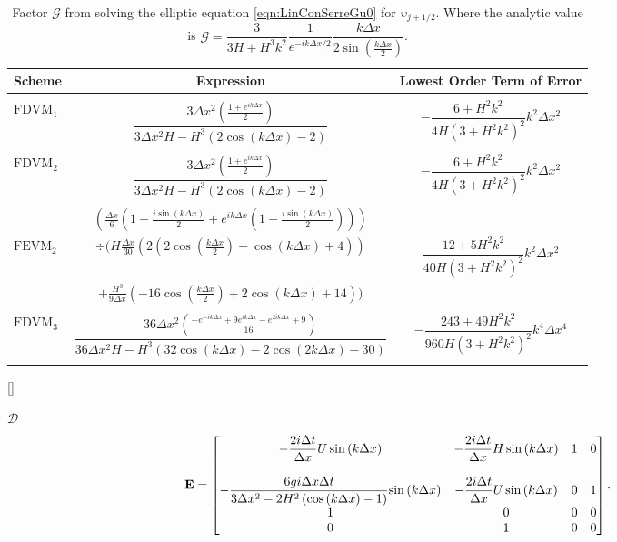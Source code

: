\begin{table}
	\centering   
	\begin{tabular}{l  c  c}
		Scheme& Expression& Lowest Order Term of Error\\
		\hline && \\
		$\text{FDVM}_1$& $\dfrac{3 \Delta x^2 \left(\frac{1 + e^{ik\Delta x}}{2}\right)}{3 \Delta x^2 H - H^3 \left(2\cos\left(k\Delta x\right) - 2\right)}$ & $-\dfrac{6 +H^2k^2}{4H \left(3 + H^2k^2\right)^2}k^2 \Delta x^2$ \\ & & \\
		$\text{FDVM}_2$& $\dfrac{3 \Delta x^2 \left(\frac{1 + e^{ik\Delta x}}{2}\right)}{3 \Delta x^2 H - H^3 \left(2\cos\left(k\Delta x\right) - 2\right)}$ & $-\dfrac{6 +H^2k^2}{4H \left(3 + H^2k^2\right)^2}k^2 \Delta x^2$ \\ & & \\
		& $\left(\frac{\Delta x}{6} \left(1 + \frac{i \sin\left(k \Delta x\right)}{2} + e^{ik\Delta x}\left(1 - \frac{i \sin\left(k \Delta x\right)}{2}\right) \right)\right)$ & \\  $\text{FEVM}_2$ & $\div  \Bigg(H\frac{\Delta x}{30} \left( 2\left(2\cos\left(\frac{k \Delta x}{2}\right) - \cos\left({k \Delta x}\right) + 4\right)  \right)$  & $\dfrac{12 + 5H^2k^2}{40H \left(3 + H^2k^2\right)^2}k^2 \Delta x^2$ \\ &$+ \frac{H^3 }{9\Delta x}\left(-16\cos\left(\frac{k\Delta x}{2}\right) + 2 \cos\left(k \Delta x\right) + 14\right)    \Bigg)$ & \\ & & \\
		$\text{FDVM}_3$&  $\dfrac{36 \Delta x^2 \left(\frac{-e^{-ik\Delta x} + 9e^{ik\Delta x} - e^{2ik\Delta x} + 9}{16}\right)}{36 \Delta x^2H - H^3\left(32\cos\left(k \Delta x\right) -2\cos\left(2k \Delta x\right) - 30\right)}$ & $-\dfrac{243 + 49H^2k^2}{960H\left(3 + H^2k^2\right)^2}k^4 \Delta x^4$ \\ & & \\ 
	\end{tabular}
	\caption{Factor $\mathcal{G}$ from solving the elliptic equation \eqref{eqn:LinConSerreGu0} for $\upsilon_{j+1/2}$. Where the analytic value is  $\mathcal{G} = \dfrac{3}{3H + H^3k^2} \dfrac{1}{e^{-ik\Delta x/2}} \dfrac{k\Delta x}{2 \sin\left(\frac{k \Delta x}{2}\right)}$.}
	\label{tab:Gfactor} 
\end{table}

[]

$\mathcal{D}$
\begin{equation*}
\mathbf{E} = \begin{bmatrix}
-  \dfrac{2 i\Delta t }{\Delta x} U\sin\left(k \Delta x\right)  & -  \dfrac{2 i\Delta t}{\Delta x} H \sin\left(k \Delta x\right)  & 1 &0 \\ \\
-\dfrac{6 gi \Delta x\Delta t}{3 \Delta x^2 -2{H^2} \left( \cos\left(k \Delta x\right) - 1 \right)}{ \sin\left(k \Delta x\right)}  & -\dfrac{2i \Delta t }{\Delta x} U \sin\left(k \Delta x\right)  & 0 &1 \\
1  & 0  &0 &0 \\
0  & 1  &0 &0 
\end{bmatrix} .
\end{equation*}

